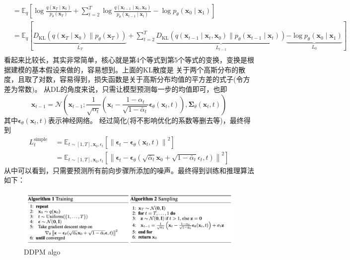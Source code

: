 \documentclass[lang=cn,newtx,10pt,scheme=chinese]{elegantbook}
\begin{document}
\begin{equation}
\begin{aligned}
& =\mathbb{E}_q\left[\log \frac{q\left(\mathbf{x}_T \mid \mathbf{x}_0\right)}{p_\theta\left(\mathbf{x}_T\right)}+\sum_{t=2}^T \log \frac{q\left(\mathbf{x}_{t-1} \mid \mathbf{x}_t, \mathbf{x}_0\right)}{p_\theta\left(\mathbf{x}_{t-1} \mid \mathbf{x}_t\right)}-\log p_\theta\left(\mathbf{x}_0 \mid \mathbf{x}_1\right)\right] \\
& =\mathbb{E}_q[\underbrace{D_{\mathrm{KL}}\left(q\left(\mathbf{x}_T \mid \mathbf{x}_0\right) \| p_\theta\left(\mathbf{x}_T\right)\right)}_{L_T}+\sum_{t=2}^T \underbrace{D_{\mathrm{KL}}\left(q\left(\mathbf{x}_{t-1} \mid \mathbf{x}_t, \mathbf{x}_0\right) \| p_\theta\left(\mathbf{x}_{t-1} \mid \mathbf{x}_t\right)\right)}_{L_{t-1}} \underbrace{-\log p_\theta\left(\mathbf{x}_0 \mid \mathbf{x}_1\right)}_{L_0}] \\
&
\end{aligned}
\end{equation}
看起来比较长，其实非常简单，核心就是第4个等式到第5个等式的变换，变换是根据建模的基本假设来做的，容易想到。上面的KL散度是
关于两个高斯分布的散度，且取了对数，容易得到，损失函数是关于高斯分布均值的平方差的式子(令方差为常数)。
从DL的角度来说，只需让模型预测每一步的均值即可，也即
\begin{equation}
\mathbf{x}_{t-1}=\mathcal{N}\left(\mathbf{x}_{t-1} ; \frac{1}{\sqrt{\alpha_t}}\left(\mathbf{x}_t-\frac{1-\alpha_t}{\sqrt{1-\bar{\alpha}_t}} \boldsymbol{\epsilon}_\theta\left(\mathbf{x}_t, t\right)\right), \mathbf{\Sigma}_\theta\left(\mathbf{x}_t, t\right)\right)
\end{equation}
其中$\boldsymbol{\epsilon}_\theta\left(\mathbf{x}_t, t\right)$表示神经网络。
经过简化(将不影响优化的系数等删去等)，最终得到
\begin{equation}
\begin{aligned}
L_t^{\text {simple }} & =\mathbb{E}_{t \sim[1, T], \mathbf{x}_0, \epsilon_t}\left[\left\|\boldsymbol{\epsilon}_t-\boldsymbol{\epsilon}_\theta\left(\mathbf{x}_t, t\right)\right\|^2\right] \\
& =\mathbb{E}_{t \sim[1, T], \mathbf{x}_0, \epsilon_t}\left[\left\|\boldsymbol{\epsilon}_t-\boldsymbol{\epsilon}_\theta\left(\sqrt{\bar{\alpha}_t} \mathbf{x}_0+\sqrt{1-\bar{\alpha}_t} \epsilon_t, t\right)\right\|^2\right]
\end{aligned}
\end{equation}
从中可以看到，只需要预测所有前向步骤所添加的噪声。最终得到训练和推理算法如下：
\begin{figure}[h!]
\centering
\includegraphics[scale=0.3]{image/DDPM-algo.png}
\caption{DDPM algo}
\label{fig:DDPM-algo}
\end{figure}
\end{document}
